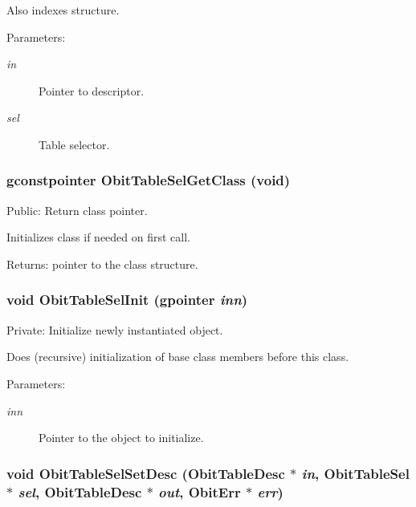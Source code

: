 Also indexes structure. \begin{Desc}
\item[Parameters:]
\begin{description}
\item[{\em in}]Pointer to descriptor. \item[{\em sel}]Table selector. \end{description}
\end{Desc}
\subsubsection{\setlength{\rightskip}{0pt plus 5cm}gconstpointer Obit\-Table\-Sel\-Get\-Class (void)}\label{ObitTableSel_8c_a7}


Public: Return class pointer. 

Initializes class if needed on first call. \begin{Desc}
\item[Returns:]pointer to the class structure. \end{Desc}
\subsubsection{\setlength{\rightskip}{0pt plus 5cm}void Obit\-Table\-Sel\-Init (gpointer {\em inn})}\label{ObitTableSel_8c_a3}


Private: Initialize newly instantiated object. 

Does (recursive) initialization of base class members before this class. \begin{Desc}
\item[Parameters:]
\begin{description}
\item[{\em inn}]Pointer to the object to initialize. \end{description}
\end{Desc}
\subsubsection{\setlength{\rightskip}{0pt plus 5cm}void Obit\-Table\-Sel\-Set\-Desc ({\bf Obit\-Table\-Desc} $\ast$ {\em in}, {\bf Obit\-Table\-Sel} $\ast$ {\em sel}, {\bf Obit\-Table\-Desc} $\ast$ {\em out}, {\bf Obit\-Err} $\ast$ {\em err})}\label{ObitTableSel_8c_a11}



